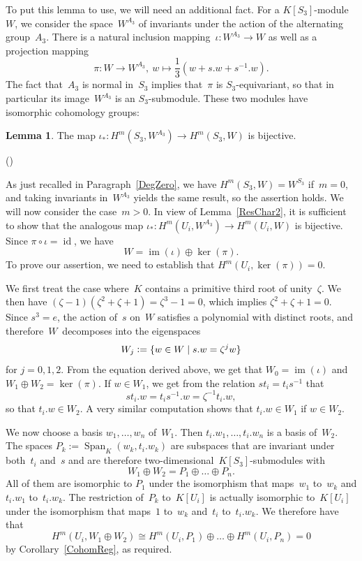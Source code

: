 \documentclass[12pt]{article}
\makeatletter
\newcounter{num}
\newenvironment{pflist}{\begin{list}{(\arabic{num})}{\usecounter{num} \leftmargin0cm \itemindent5pt}}{\end{list}}
\theoremstyle{definition}
\newtheorem{Lemma}[Satz]{Lemma}
\theoremstyle{break}
\renewenvironment{proof}[1][\proofname]{\par
\vspace{-5pt}%
\pushQED{\qed}%
\normalfont
\topsep0pt \partopsep0pt %
\trivlist
\item[\hskip\labelsep
\bfseries
#1\@addpunct{.}]\ignorespaces
}{%
\popQED\endtrivlist\@endpefalse
\addvspace{6pt plus 6pt} %
}
\DeclareMathOperator\im{im}
\DeclareMathOperator\Span{Span}
\DeclareMathOperator\id{id}
\renewcommand{\1}{\mathbbm{1}}
\newcommand{\deq}{\vcentcolon =}
\makeatother
\begin{document}
To put this lemma to use, we will need an additional fact. For a $K[S_3]$-module~$W$, we consider the space~$W^{A_3}$ of invariants under the action of the alternating group~$A_3$. There is a natural inclusion mapping~$\iota \colon W^{A_3} \to W$ as well as a projection mapping
\[\pi \colon W \to W^{A_3},~w \mapsto \frac{1}{3} (w + s.w + s^{-1}.w).\]
The fact that~$A_3$ is normal in~$S_3$ implies that~$\pi$ is $S_3$-equivariant, so that in particular its image~$W^{A_3}$ is an $S_3$-submodule. These two modules have isomorphic cohomology groups:
\begin{Lemma} \label{InclChar2}
The map $\iota_* : H^m(S_3,W^{A_3}) \to H^m(S_3,W)$ is bijective.
\end{Lemma}
\begin{proof}
\begin{pflist}
\item
As just recalled in Paragraph~\ref{DegZero}, we have $H^m(S_3,W) = W^{S_3}$ if~$m=0$, and taking invariants in~$W^{A_3}$ yields the same result, so the assertion holds. We will now consider the case~$m>0$. In view of Lemma~\ref{ResChar2}, it is sufficient to show that the analogous map
\mbox{$\iota_* : H^m(U_i,W^{A_3}) \to H^m(U_i,W)$} is bijective. Since $\pi \circ \iota = \id$, we have
\[W = \im(\iota) \oplus \ker(\pi).\]
To prove our assertion, we need to establish that $H^m(U_i,\ker(\pi)) = 0$.

\item
We first treat the case where~$K$ contains a primitive third root of unity~$\zeta$. We then have
$(\zeta - 1)(\zeta^2 + \zeta + 1) = \zeta^3 - 1 = 0$, which implies
$\zeta^2 + \zeta + 1 = 0$. Since $s^3 = e$, the action of~$s$ on~$W$ satisfies a polynomial with distinct roots, and therefore~$W$~decomposes into the eigenspaces
\[W_j \deq \{w \in W \mid s.w = \zeta^{j} w\}\]
for $j=0,1,2$. From the equation derived above, we get that $W_0 = \im(\iota)$ and $W_1 \oplus W_2 = \ker(\pi)$. If $w \in W_1$, we get from the relation $s t_i = t_i s^{-1}$ that
\[s t_i.w = t_i s^{-1}.w = \zeta^{-1} t_i.w,\]
so that $t_i.w \in W_2$. A very similar computation shows that $t_i.w \in W_1$ if
$w \in W_2$.

We now choose a basis $w_1,\ldots,w_n$ of~$W_1$. Then $t_i.w_1,\ldots,t_i.w_n$ is a basis of~$W_2$.
The spaces $P_k := \Span_K(w_k,t_i.w_k)$ are subspaces that are invariant under both~$t_i$ and~$s$ and are therefore two-dimensional~$K[S_3]$-submodules with
$$W_1 \oplus W_2 = P_1 \oplus \dots \oplus P_n.$$
All of them are isomorphic to $P_1$ under the isomorphism that maps~$w_1$ to~$w_k$ and
$t_i.w_1$ to~$t_i.w_k$. The restriction of~$P_k$ to~$K[U_i]$ is actually isomorphic to~$K[U_i]$ under the isomorphism that maps~$1$ to~$w_k$ and~$t_i$ to~$ t_i.w_k$. We therefore have that
\[H^m(U_i,W_1 \oplus W_2) \cong H^m(U_i,P_1) \oplus \dots \oplus H^m(U_i,P_n) = 0\]
by Corollary~\ref{CohomReg}, as required.


\end{pflist}
\end{proof}
\end{document}
